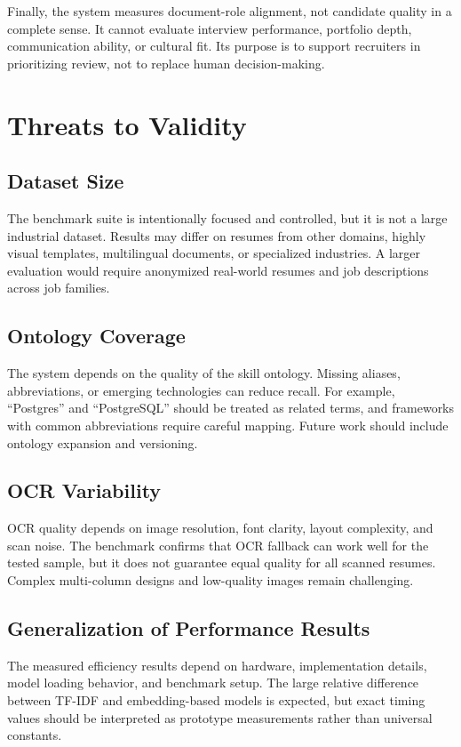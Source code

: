 \documentclass[conference]{IEEEtran}
\begin{document}
Finally, the system measures document-role alignment, not candidate quality in a complete sense. It cannot evaluate interview performance, portfolio depth, communication ability, or cultural fit. Its purpose is to support recruiters in prioritizing review, not to replace human decision-making.

\section{Threats to Validity}
\subsection{Dataset Size}
The benchmark suite is intentionally focused and controlled, but it is not a large industrial dataset. Results may differ on resumes from other domains, highly visual templates, multilingual documents, or specialized industries. A larger evaluation would require anonymized real-world resumes and job descriptions across job families.

\subsection{Ontology Coverage}
The system depends on the quality of the skill ontology. Missing aliases, abbreviations, or emerging technologies can reduce recall. For example, ``Postgres'' and ``PostgreSQL'' should be treated as related terms, and frameworks with common abbreviations require careful mapping. Future work should include ontology expansion and versioning.

\subsection{OCR Variability}
OCR quality depends on image resolution, font clarity, layout complexity, and scan noise. The benchmark confirms that OCR fallback can work well for the tested sample, but it does not guarantee equal quality for all scanned resumes. Complex multi-column designs and low-quality images remain challenging.

\subsection{Generalization of Performance Results}
The measured efficiency results depend on hardware, implementation details, model loading behavior, and benchmark setup. The large relative difference between TF-IDF and embedding-based models is expected, but exact timing values should be interpreted as prototype measurements rather than universal constants.
\end{document}
